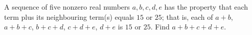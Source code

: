 A sequence of five nonzero real numbers $a,b,c,d,e$ has the property that each term plus its neighbouring term(s) equals $15$ or $25$; that is, each of $a+b$, $a+b+c$, $b+c+d$, $c+d+e$, $d+e$ is $15$ or $25$. Find $a+b+c+d+e$.
